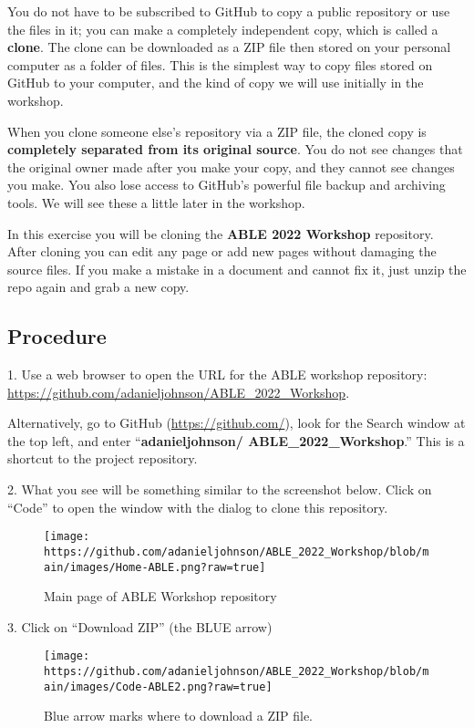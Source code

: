 \documentclass[
]{article}
\begin{document}
You do not have to be subscribed to GitHub to copy a public repository
or use the files in it; you can make a completely independent copy,
which is called a \textbf{clone}. The clone can be downloaded as a ZIP
file then stored on your personal computer as a folder of files. This is
the simplest way to copy files stored on GitHub to your computer, and
the kind of copy we will use initially in the workshop.

When you clone someone else's repository via a ZIP file, the cloned copy
is \textbf{completely separated from its original source}. You do not
see changes that the original owner made after you make your copy, and
they cannot see changes you make. You also lose access to GitHub's
powerful file backup and archiving tools. We will see these a little
later in the workshop.

In this exercise you will be cloning the \textbf{ABLE 2022 Workshop}
repository. After cloning you can edit any page or add new pages without
damaging the source files. If you make a mistake in a document and
cannot fix it, just unzip the repo again and grab a new copy.

\hypertarget{procedure}{%
\subsection{Procedure}\label{procedure}}

1. Use a web browser to open the URL for the ABLE workshop repository:
\url{https://github.com/adanieljohnson/ABLE_2022_Workshop}.

Alternatively, go to GitHub (\url{https://github.com/}), look for the
Search window at the top left, and enter ``\textbf{adanieljohnson/
ABLE\_2022\_Workshop}.'' This is a shortcut to the project repository.

2. What you see will be something similar to the screenshot below. Click
on ``Code'' to open the window with the dialog to clone this repository.

\begin{figure}
\centering
\texttt{[image: https://github.com/adanieljohnson/ABLE\_2022\_Workshop/blob/main/images/Home-ABLE.png?raw=true]}
\caption{Main page of ABLE Workshop repository}
\end{figure}

3. Click on ``Download ZIP'' (the BLUE arrow)

\begin{figure}
\centering
\texttt{[image: https://github.com/adanieljohnson/ABLE\_2022\_Workshop/blob/main/images/Code-ABLE2.png?raw=true]}
\caption{Blue arrow marks where to download a ZIP file.}
\end{figure}
\end{document}
